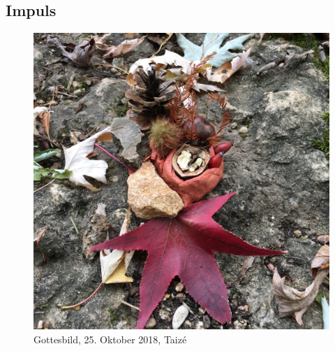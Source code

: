 \subsection{Impuls}
\begin{figure}
    \centering
    \includegraphics[scale=0.09]
{Pictures/2018-10-Gottesbild-Taize.jpg}
    \caption{Gottesbild, 25. Oktober 2018, Taizé}
    \label{fig:Bildmeditation}
\end{figure}
